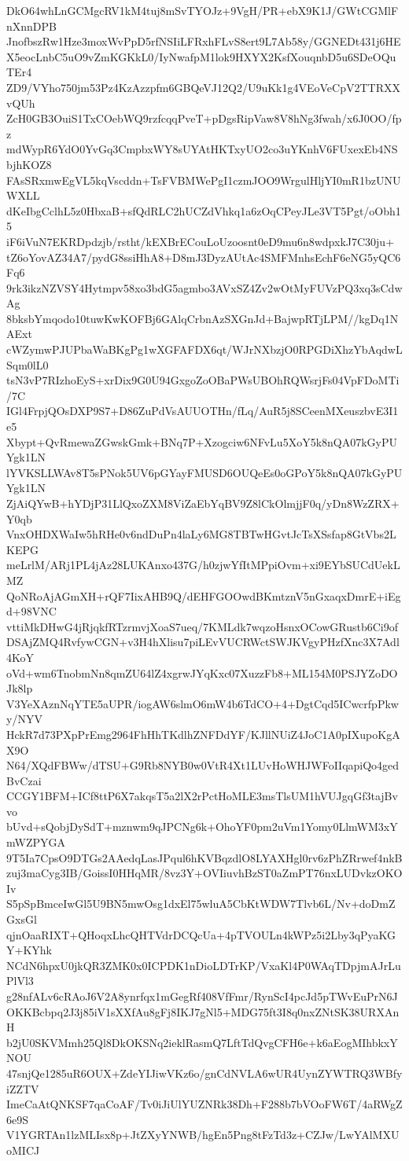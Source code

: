 DkO64whLnGCMgcRV1kM4tuj8mSvTYOJz+9VgH/PR+ebX9K1J/GWtCGMlFnXnnDPB
JnofbszRw1Hze3moxWvPpD5rfNSIiLFRxhFLvS8ert9L7Ab58y/GGNEDt431j6HE
X5eocLnbC5uO9vZmKGKkL0/IyNwafpM1lok9HXYX2KsfXouqnbD5u6SDeOQuTEr4
ZD9/VYho750jm53Pz4KzAzzpfm6GBQeVJ12Q2/U9uKk1g4VEoVeCpV2TTRXXvQUh
ZcH0GB3OuiS1TxCOebWQ9rzfcqqPveT+pDgsRipVaw8V8hNg3fwah/x6J0OO/fpz
mdWypR6YdO0YvGq3CmpbxWY8sUYAtHKTxyUO2co3uYKnhV6FUxexEb4NSbjhKOZ8
FAsSRxmwEgVL5kqVscddn+TsFVBMWePgI1czmJOO9WrgulHljYI0mR1bzUNUWXLL
dKeIbgCclhL5z0HbxaB+sfQdRLC2hUCZdVhkq1a6zOqCPeyJLe3VT5Pgt/oObh15
iF6iVuN7EKRDpdzjb/rstht/kEXBrECouLoUzoosnt0eD9mu6n8wdpxkJ7C30ju+
tZ6oYovAZ34A7/pydG8ssiHhA8+D8mJ3DyzAUtAc4SMFMnhsEchF6eNG5yQC6Fq6
9rk3ikzNZVSY4Hytmpv58xo3bdG5agmbo3AVxSZ4Zv2wOtMyFUVzPQ3xq3sCdwAg
8bksbYmqodo10tuwKwKOFBj6GAlqCrbnAzSXGnJd+BajwpRTjLPM//kgDq1NAExt
cWZymwPJUPbaWaBKgPg1wXGFAFDX6qt/WJrNXbzjO0RPGDiXhzYbAqdwLSqm0lL0
tsN3vP7RIzhoEyS+xrDix9G0U94GxgoZoOBaPWsUBOhRQWsrjFs04VpFDoMTi/7C
IGl4FrpjQOsDXP9S7+D86ZuPdVsAUUOTHn/fLq/AuR5j8SCeenMXeuszbvE3I1e5
Xbypt+QvRmewaZGwskGmk+BNq7P+Xzogciw6NFvLu5XoY5k8nQA07kGyPUYgk1LN
lYVKSLLWAv8T5sPNok5UV6pGYayFMUSD6OUQeEs0oGPoY5k8nQA07kGyPUYgk1LN
ZjAiQYwB+hYDjP31LlQxoZXM8ViZaEbYqBV9Z8lCkOlmjjF0q/yDn8WzZRX+Y0qb
VnxOHDXWaIw5hRHe0v6ndDuPn4laLy6MG8TBTwHGvtJcTsXSsfap8GtVbs2LKEPG
meLrlM/ARj1PL4jAz28LUKAnxo437G/h0zjwYfItMPpiOvm+xi9EYbSUCdUekLMZ
QoNRoAjAGmXH+rQF7IixAHB9Q/dEHFGOOwdBKmtznV5nGxaqxDmrE+iEgd+98VNC
vttiMkDHwG4jRjqkfRTzrmvjXoaS7ueq/7KMLdk7wqzoHsnxOCowGRustb6Ci9of
DSAjZMQ4RvfywCGN+v3H4hXlisu7piLEvVUCRWctSWJKVgyPHzfXnc3X7Adl4KoY
oVd+wm6TnobmNn8qmZU64lZ4xgrwJYqKxc07XuzzFb8+ML154M0PSJYZoDOJk8lp
V3YeXAznNqYTE5aUPR/iogAW6slmO6mW4b6TdCO+4+DgtCqd5ICwcrfpPkwy/NYV
HckR7d73PXpPrEmg2964FhHhTKdlhZNFDdYF/KJllNUiZ4JoC1A0pIXupoKgAX9O
N64/XQdFBWw/dTSU+G9Rb8NYB0w0VtR4Xt1LUvHoWHJWFoIIqapiQo4gedBvCzai
CCGY1BFM+ICf8ttP6X7akqsT5a2lX2rPctHoMLE3msTlsUM1hVUJgqGf3tajBvvo
bUvd+sQobjDySdT+mznwm9qJPCNg6k+OhoYF0pm2uVm1Yomy0LlmWM3xYmWZPYGA
9T5Ia7CpsO9DTGs2AAedqLasJPqul6hKVBqzdlO8LYAXHgl0rv6zPhZRrwef4nkB
zuj3maCyg3IB/GoissI0HHqMR/8vz3Y+OVIiuvhBzST0aZmPT76nxLUDvkzOKOIv
S5pSpBmceIwGl5U9BN5mwOsg1dxEl75wluA5CbKtWDW7Tlvb6L/Nv+doDmZGxsGl
qjnOaaRIXT+QHoqxLhcQHTVdrDCQcUa+4pTVOULn4kWPz5i2Lby3qPyaKGY+KYhk
NCdN6hpxU0jkQR3ZMK0x0ICPDK1nDioLDTrKP/VxaKl4P0WAqTDpjmAJrLuPlVl3
g28nfALv6cRAoJ6V2A8ynrfqx1mGegRf408VfFmr/RynScI4pcJd5pTWvEuPrN6J
OKKBcbpq2J3j85iV1sXXfAu8gFj8IKJ7gNl5+MDG75ft3I8q0nxZNtSK38URXAnH
b2jU0SKVMmh25Ql8DkOKSNq2ieklRasmQ7LftTdQvgCFH6e+k6aEogMIhbkxYNOU
47snjQe1285uR6OUX+ZdeYIJiwVKz6o/gnCdNVLA6wUR4UynZYWTRQ3WBfyiZZTV
ImeCaAtQNKSF7qaCoAF/Tv0iJiUlYUZNRk38Dh+F288b7bVOoFW6T/4aRWgZ6e9S
V1YGRTAn1lzMLIsx8p+JtZXyYNWB/hgEn5Png8tFzTd3z+CZJw/LwYAlMXUoMICJ
